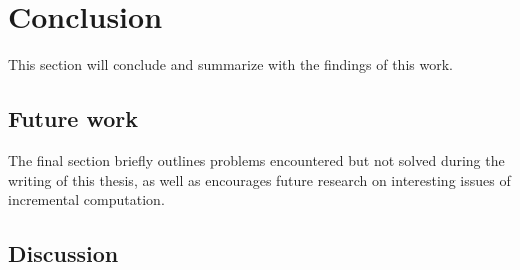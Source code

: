 \section{Conclusion}
This section will conclude and summarize with the findings of this work. 

\subsection{Future work}
The final section briefly outlines problems encountered but not solved during the writing of this thesis, as well as encourages future research on interesting issues of incremental computation.

 \subsection{Discussion}